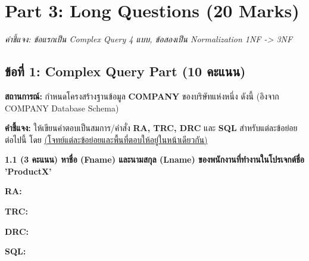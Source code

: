 \documentclass[a4paper,12pt]{article}
\begin{document}
\newpage
\section*{Part 3: Long Questions (20 Marks)}
\textit{คำชี้แจง: ข้อแรกเป็น Complex Query 4 แบบ, ข้อสองเป็น Normalization 1NF -> 3NF}

\subsection*{ข้อที่ 1: Complex Query Part (10 คะแนน)}
\textbf{สถานการณ์:} กำหนดโครงสร้างฐานข้อมูล \textbf{COMPANY} ของบริษัทแห่งหนึ่ง ดังนี้ (อิงจาก COMPANY Database Schema)

\vspace{0.3cm}
\vspace{0.3cm}

\textbf{คำชี้แจง:} ให้เขียนคำตอบเป็นสมการ/คำสั่ง \textbf{RA, TRC, DRC} และ \textbf{SQL} สำหรับแต่ละข้อย่อยต่อไปนี้ โดย \underline{(โจทย์แต่ละข้อย่อยและพื้นที่ตอบให้อยู่ในหน้าเดียวกัน)}

\textbf{1.1 (3 คะแนน) หาชื่อ (Fname) และนามสกุล (Lname) ของพนักงานที่ทำงานในโปรเจกต์ชื่อ 'ProductX'}

\vspace{0.1cm}
\textbf{RA:}
\vspace{2.5cm}

\textbf{TRC:}
\vspace{2.5cm}

\textbf{DRC:}
\vspace{2.5cm}

\textbf{SQL:}
\vspace{2.5cm}
\end{document}
